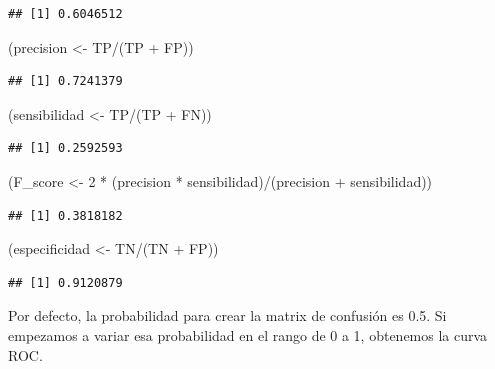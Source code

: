 \documentclass[
  12pt,
]{book}
\newenvironment{Shaded}{\begin{snugshade}}{\end{snugshade}}
\newcommand{\DecValTok}[1]{\textcolor[rgb]{0.00,0.00,0.81}{#1}}
\newcommand{\NormalTok}[1]{#1}
\newcommand{\OtherTok}[1]{\textcolor[rgb]{0.56,0.35,0.01}{#1}}
\newcommand{\SpecialCharTok}[1]{\textcolor[rgb]{0.00,0.00,0.00}{#1}}
\begin{document}
\begin{verbatim}
## [1] 0.6046512
\end{verbatim}

\begin{Shaded}
\begin{Highlighting}[]
\NormalTok{(precision }\OtherTok{\textless{}{-}}\NormalTok{ TP}\SpecialCharTok{/}\NormalTok{(TP }\SpecialCharTok{+}\NormalTok{ FP))}
\end{Highlighting}
\end{Shaded}

\begin{verbatim}
## [1] 0.7241379
\end{verbatim}

\begin{Shaded}
\begin{Highlighting}[]
\NormalTok{(sensibilidad }\OtherTok{\textless{}{-}}\NormalTok{ TP}\SpecialCharTok{/}\NormalTok{(TP }\SpecialCharTok{+}\NormalTok{ FN))}
\end{Highlighting}
\end{Shaded}

\begin{verbatim}
## [1] 0.2592593
\end{verbatim}

\begin{Shaded}
\begin{Highlighting}[]
\NormalTok{(F\_score }\OtherTok{\textless{}{-}} \DecValTok{2} \SpecialCharTok{*}\NormalTok{ (precision }\SpecialCharTok{*}\NormalTok{ sensibilidad)}\SpecialCharTok{/}\NormalTok{(precision }\SpecialCharTok{+}
\NormalTok{    sensibilidad))}
\end{Highlighting}
\end{Shaded}

\begin{verbatim}
## [1] 0.3818182
\end{verbatim}

\begin{Shaded}
\begin{Highlighting}[]
\NormalTok{(especificidad }\OtherTok{\textless{}{-}}\NormalTok{ TN}\SpecialCharTok{/}\NormalTok{(TN }\SpecialCharTok{+}\NormalTok{ FP))}
\end{Highlighting}
\end{Shaded}

\begin{verbatim}
## [1] 0.9120879
\end{verbatim}

Por defecto, la probabilidad para crear la matrix de confusión es 0.5.
Si empezamos a variar esa probabilidad en el rango de 0 a 1, obtenemos
la curva ROC.
\end{document}
